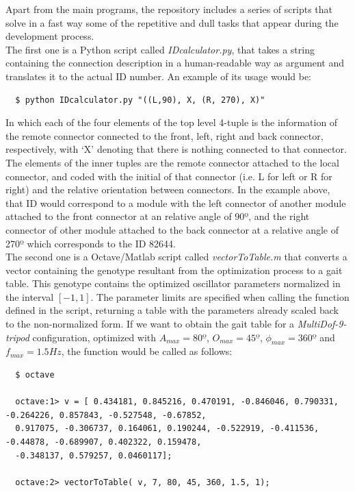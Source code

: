 Apart from the main programs, the repository includes a series of scripts that solve in a fast way some of the repetitive and dull tasks that appear during the development process.\\

The first one is a Python script called \emph{IDcalculator.py}, that takes a string containing the connection description in a human-readable way as argument and translates it to the actual ID number. An example of its usage would be:
\Bash
\begin{lstlisting}
  $ python IDcalculator.py "((L,90), X, (R, 270), X)"
\end{lstlisting}

In which each of the four elements of the top level 4-tuple is the information of the remote connector connected to the front, left, right and back connector, respectively, with `X' denoting that there is nothing connected to that connector. The elements of the inner tuples are the remote connector attached to the local connector, and coded with the initial of that connector (i.e. L for left or R for right) and the relative orientation between connectors. In the example above, that ID would correspond to a module with the left connector of another module attached to the front connector at an relative angle of 90º, and the right connector of other module attached to the back connector at a relative angle of 270º which corresponds to the ID 82644.\\

The second one is a Octave/Matlab script called \emph{vectorToTable.m} that converts a vector containing the genotype resultant from the optimization process to a gait table. This genotype contains the optimized oscillator parameters normalized in the interval $[-1,1]$. The parameter limits are specified when calling the function defined in the script, returning a table with the parameters already scaled back to the non-normalized form. If we want to obtain the gait table for a \emph{MultiDof-9-tripod} configuration, optimized with $A_{max} = 80º$,  $O_{max} = 45º$, $\phi_{max} = 360º$ and $f_{max} = 1.5Hz$, the function would be called as follows:

\Bash
\begin{lstlisting}
  $ octave
  
  octave:1> v = [ 0.434181, 0.845216, 0.470191, -0.846046, 0.790331, -0.264226, 0.857843, -0.527548, -0.67852, 
  0.917075, -0.306737, 0.164061, 0.190244, -0.522919, -0.411536, -0.44878, -0.689907, 0.402322, 0.159478,
  -0.348137, 0.579257, 0.0460117];
  
  octave:2> vectorToTable( v, 7, 80, 45, 360, 1.5, 1);
\end{lstlisting}

